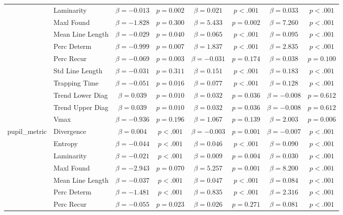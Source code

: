 \begin{tabular}{llcc|cc|cc}
 & Laminarity & $\beta = -0.013$ & $p = 0.002$ & $\beta = 0.021$ & $p < .001$ & $\beta = 0.033$ & $p < .001$ \\
 & Maxl Found & $\beta = -1.828$ & $p = 0.300$ & $\beta = 5.433$ & $p = 0.002$ & $\beta = 7.260$ & $p < .001$ \\
 & Mean Line Length & $\beta = -0.029$ & $p = 0.040$ & $\beta = 0.065$ & $p < .001$ & $\beta = 0.095$ & $p < .001$ \\
 & Perc Determ & $\beta = -0.999$ & $p = 0.007$ & $\beta = 1.837$ & $p < .001$ & $\beta = 2.835$ & $p < .001$ \\
 & Perc Recur & $\beta = -0.069$ & $p = 0.003$ & $\beta = -0.031$ & $p = 0.174$ & $\beta = 0.038$ & $p = 0.100$ \\
 & Std Line Length & $\beta = -0.031$ & $p = 0.311$ & $\beta = 0.151$ & $p < .001$ & $\beta = 0.183$ & $p < .001$ \\
 & Trapping Time & $\beta = -0.051$ & $p = 0.016$ & $\beta = 0.077$ & $p < .001$ & $\beta = 0.128$ & $p < .001$ \\
 & Trend Lower Diag & $\beta = 0.039$ & $p = 0.010$ & $\beta = 0.032$ & $p = 0.036$ & $\beta = -0.008$ & $p = 0.612$ \\
 & Trend Upper Diag & $\beta = 0.039$ & $p = 0.010$ & $\beta = 0.032$ & $p = 0.036$ & $\beta = -0.008$ & $p = 0.612$ \\
 & Vmax & $\beta = -0.936$ & $p = 0.196$ & $\beta = 1.067$ & $p = 0.139$ & $\beta = 2.003$ & $p = 0.006$ \\
\midrule
\multirow{12}{*}{pupil_metric} & Divergence & $\beta = 0.004$ & $p < .001$ & $\beta = -0.003$ & $p = 0.001$ & $\beta = -0.007$ & $p < .001$ \\
 & Entropy & $\beta = -0.044$ & $p < .001$ & $\beta = 0.046$ & $p < .001$ & $\beta = 0.090$ & $p < .001$ \\
 & Laminarity & $\beta = -0.021$ & $p < .001$ & $\beta = 0.009$ & $p = 0.004$ & $\beta = 0.030$ & $p < .001$ \\
 & Maxl Found & $\beta = -2.943$ & $p = 0.070$ & $\beta = 5.257$ & $p = 0.001$ & $\beta = 8.200$ & $p < .001$ \\
 & Mean Line Length & $\beta = -0.037$ & $p < .001$ & $\beta = 0.047$ & $p < .001$ & $\beta = 0.084$ & $p < .001$ \\
 & Perc Determ & $\beta = -1.481$ & $p < .001$ & $\beta = 0.835$ & $p < .001$ & $\beta = 2.316$ & $p < .001$ \\
 & Perc Recur & $\beta = -0.055$ & $p = 0.023$ & $\beta = 0.026$ & $p = 0.271$ & $\beta = 0.081$ & $p < .001$ \\

\end{tabular}
